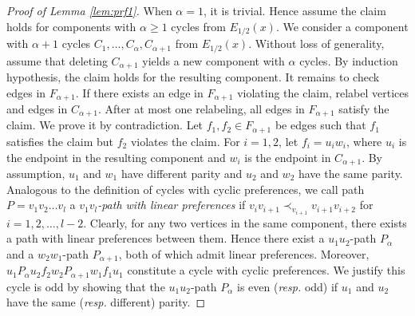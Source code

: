 \documentclass[11pt]{article}
\numberwithin{theorem}{section}
\begin{document}
\begin{proof}[Proof of Lemma \ref{lem:prf1}]
When $\alpha=1$, it is trivial.
Hence assume the claim holds for components with $\alpha\geq 1$ cycles from $E_{1/2}(x)$. We consider a component with $\alpha +1$ cycles $C_1, \ldots, C_{\alpha}, C_{\alpha+1}$ from $E_{1/2}(x)$. 
Without loss of generality, assume that deleting $C_{\alpha+1}$ yields a new component with $\alpha$ cycles.
By induction hypothesis, the claim holds for the resulting component. 
It remains to check edges in $F_{\alpha+1}$. If there exists an edge in $F_{\alpha+1}$ violating the claim, relabel vertices and edges in $C_{\alpha+1}$. After at most one relabeling, all edges in $F_{\alpha+1}$ satisfy the claim. We prove it by contradiction. Let $f_1,f_2 \in F_{\alpha +1}$ be edges such that $f_1$ satisfies the claim but $f_2$ violates the claim. For $i=1,2$, let $f_i=u_i w_i$, where $u_i$ is the endpoint in the resulting component and $w_i$ is the endpoint in $C_{\alpha+1}$. By assumption, $u_1$ and $w_1$ have different parity and $u_2$ and $w_2$ have the same parity.
Analogous to the definition of cycles with cyclic preferences, we call path $P=v_1 v_2 \ldots v_l$ a \textit{$v_1 v_l$-path with linear preferences} if $v_iv_{i+1}\prec_{v_{i+1}}v_{i+1}v_{i+2}$ for $i=1,2,\ldots,l-2$. Clearly, for any two vertices in the same component, there exists a path with linear preferences between them.
Hence there exist a $u_1 u_2$-path $P_\alpha$ and a $w_2 w_1$-path $P_{\alpha+1}$, both of which admit linear preferences.
Moreover, $u_1 P_\alpha u_2 f_2 w_2 P_{\alpha+1} w_1 f_1 u_1$ constitute a cycle with cyclic preferences. We justify this cycle is odd by 
showing that the $u_1 u_2$-path $P_\alpha$ is even (\textit{resp.} odd) if $u_1$ and $u_2$ have the same (\textit{resp.} different) parity.


\end{proof}
\end{document}
